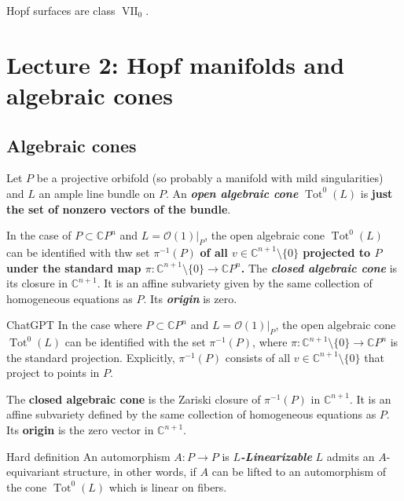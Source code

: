 \begin{claim}\leavevmode
	Hopf surfaces are class \(\operatorname{V I I}_0\).
\end{claim}

\section{Lecture 2: Hopf manifolds and algebraic cones}

\subsection{Algebraic cones}

\begin{defn}\leavevmode
	Let \(P\) be a projective orbifold (so probably a manifold with mild singularities) and \(L\) an ample line bundle on \(P\). An \textit{\textbf{open algebraic cone}} \(\operatorname{Tot}^0(L)\) is \textbf{just the set of nonzero vectors of the bundle}. 
\end{defn}

In the case of \(P \subset \mathbb{C}P^{n}\) and \(L=\mathcal{O}(1)|_{P}\), the open algebraic cone \(\operatorname{Tot}^0(L)\) can be identified with thw set \(\pi^{-1}(P)\) \textbf{of all \(v \in \mathbb{C}^{n+1}\setminus\{0\}\) projected to \(P\) under the standard map \(\pi:\mathbb{C}^{n+1}\setminus\{0\} \to \mathbb{C}P^{n}\).} The \textit{\textbf{closed algebraic cone}} is its closure in \(\mathbb{C}^{n+1}\). It is an affine subvariety given by the same collection of homogeneous equations as \(P\). Its \textit{\textbf{origin}} is zero.

\begin{thing5}{ChatGPT}\leavevmode
In the case where \(P \subset \mathbb{C}P^n\) and \(L = \mathcal{O}(1)|_P\), the open algebraic cone \(\operatorname{Tot}^0(L)\) can be identified with the set \(\pi^{-1}(P)\), where \(\pi: \mathbb{C}^{n+1} \setminus \{0\} \to \mathbb{C}P^n\) is the standard projection. Explicitly, \(\pi^{-1}(P)\) consists of all \(v \in \mathbb{C}^{n+1} \setminus \{0\}\) that project to points in \(P\).

The \textbf{closed algebraic cone} is the Zariski closure of \(\pi^{-1}(P)\) in \(\mathbb{C}^{n+1}\). It is an affine subvariety defined by the same collection of homogeneous equations as \(P\). Its \textbf{origin} is the zero vector in \(\mathbb{C}^{n+1}\).
\end{thing5}

\begin{thing6}{Hard definition}\leavevmode
An automorphism \(A: P \to P\) is \textit{\textbf{\(L\)-Linearizable}} \(L\) admits an $A$-equivariant structure, in other words, if $A$ can be lifted to an automorphism of the cone \(\operatorname{Tot}^0(L)\) which is linear on fibers.
\end{thing6}

